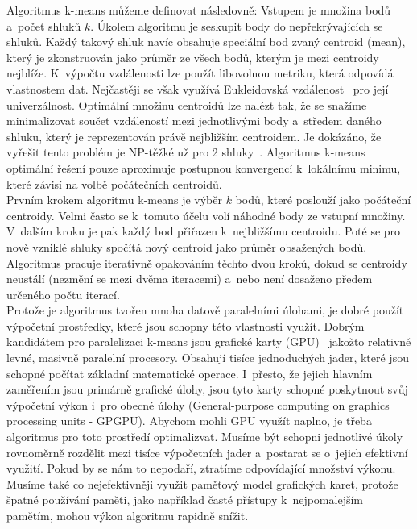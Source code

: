 Algoritmus k-means můžeme definovat následovně: Vstupem je množina bodů a~počet shluků $k$. Úkolem algoritmu je seskupit body do nepřekrývajících se shluků. Každý takový shluk navíc obsahuje speciální bod zvaný centroid (\mbox{mean}), který je zkonstruován jako průměr ze všech bodů, kterým je mezi centroidy nejblíže. K~výpočtu vzdálenosti lze použít libovolnou metriku, která odpovídá vlastnostem dat. Nejčastěji se však využívá Eukleidovská vzdálenost~\cite{Zechner09} pro její univerzálnost. Optimální množinu centroidů lze nalézt tak, že se snažíme minimalizovat součet vzdáleností mezi jednotlivými body a~středem daného shluku, který je reprezentován právě nejbližším centroidem. Je dokázáno, že vyřešit tento problém je NP-těžké už pro 2 shluky~\cite{Drineas04}. Algoritmus k-means optimální řešení pouze aproximuje postupnou konvergencí k~lokálnímu minimu, které závisí na volbě počátečních centroidů.\\

Prvním krokem algoritmu k-means je výběr $k$ bodů, které poslouží jako počáteční centroidy. Velmi často se k~tomuto účelu volí náhodné body ze vstupní množiny. V~dalším kroku je pak každý bod přiřazen k~nejbližšímu centroidu. Poté se pro nově vzniklé shluky spočítá nový centroid jako průměr obsažených bodů. Algoritmus pracuje iterativně opakováním těchto dvou kroků, dokud se centroidy neustálí (nezmění se mezi dvěma iteracemi) a~nebo není dosaženo předem určeného počtu iterací.\\

Protože je algoritmus tvořen mnoha datově paralelními úlohami, je dobré použít výpočetní prostředky, které jsou schopny této vlastnosti využít.
Dobrým kandidátem pro paralelizaci k-means jsou grafické karty (GPU)~\cite{Zechner09} jakožto relativně levné, masivně paralelní procesory. Obsahují tisíce jednoduchých jader, které jsou schopné počítat základní matematické operace. I~přesto, že jejich hlavním zaměřením jsou primárně grafické úlohy, jsou tyto karty schopné poskytnout svůj výpočetní výkon i~pro obecné úlohy (General-purpose computing on graphics processing units - GPGPU). Abychom mohli GPU využít naplno, je třeba algoritmus pro toto prostředí optimalizvat. Musíme být schopni jednotlivé úkoly rovnoměrně rozdělit mezi tisíce výpočetních jader a~postarat se o~jejich efektivní využití. Pokud by se nám to nepodaří, ztratíme odpovídající množství výkonu. Musíme také co nejefektivněji využit paměťový model grafických karet, protože špatné používání paměti, jako na\-pří\-klad časté přístupy k~nejpomalejším pamětím, mohou výkon algoritmu rapidně snížit.\\

